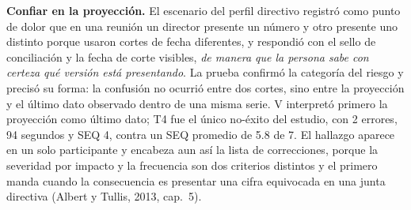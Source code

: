 \textbf{Confiar en la proyección.} El escenario del perfil directivo registró como punto de dolor
que en una reunión un director presente un número y otro presente uno distinto porque usaron
cortes de fecha diferentes, y respondió con el sello de conciliación y la fecha de corte visibles,
\emph{de manera que la persona sabe con certeza qué versión está presentando}. La prueba confirmó
la categoría del riesgo y precisó su forma: la confusión no ocurrió entre dos cortes, sino entre
la proyección y el último dato observado dentro de una misma serie. V interpretó primero la
proyección como último dato; T4 fue el único no-éxito del estudio, con 2 errores, 94 segundos y
SEQ 4, contra un SEQ promedio de 5.8 de 7. El hallazgo aparece en un solo participante y encabeza
aun así la lista de correcciones, porque la severidad por impacto y la frecuencia son dos
criterios distintos y el primero manda cuando la consecuencia es presentar una cifra equivocada en
una junta directiva (Albert y Tullis, 2013, cap.~5).

